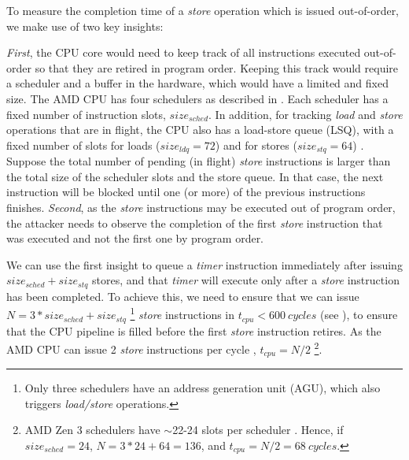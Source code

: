 To measure the completion time of a \textit{store} operation which is issued out-of-order, we make use of two key insights:

\textit{First}, the CPU core would need to keep track of all instructions executed out-of-order so that they are retired in program order.
Keeping this track would require a scheduler and a buffer in the hardware, which would have a limited and fixed size.
The AMD CPU has four schedulers as described in . Each scheduler has a fixed number of instruction slots, $size_{sched}$.
In addition, for tracking \textit{load} and \textit{store} operations that are in flight, the CPU also has a load-store queue (LSQ), with a fixed number of slots for loads ($size_{ldq} = 72$) and for stores ($size_{stq} = 64$) \cite{amd_7003_software_optimization_guide}.
Suppose the total number of pending (in flight) \textit{store} instructions is larger than the total size of the scheduler slots and the store queue. 
In that case, the next instruction will be blocked until one (or more) of the previous instructions finishes.
\textit{Second}, as the \textit{store} instructions may be executed out of program order, the attacker needs to observe the completion of the first \textit{store} instruction that was executed and not the first one by program order.

We can use the first insight to queue a \textit{timer} instruction immediately after issuing $size_{sched} + size_{stq}$ stores, and that \textit{timer} will execute only after a \textit{store} instruction has been completed.
To achieve this, we need to ensure that we can issue $N = 3 * size_{sched} + size_{stq}$ 
\footnote{Only three schedulers have an address generation unit (AGU), which also triggers \textit{load/store} operations.}
\textit{store} instructions in $t_{cpu} < 600~cycles$ (see ), to ensure that the CPU pipeline is filled before the first \textit{store} instruction retires.
As the AMD CPU can issue 2 \textit{store} instructions per cycle \cite{amd_7003_software_optimization_guide}, $t_{cpu} = N/2$
\footnote{AMD Zen 3 schedulers have $\sim$22-24 slots per scheduler \cite{gast2023squip}. Hence, if $size_{sched} = 24$, $N = 3 * 24 + 64 = 136$, and $t_{cpu} = N/2 = 68~cycles$.}.


